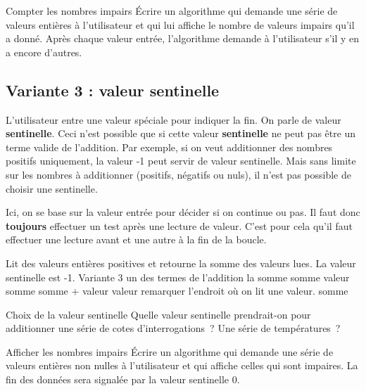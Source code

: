 		\begin{Exercice}{Compter les nombres impairs}
			Écrire un algorithme qui demande une série
			de valeurs entières à l'utilisateur
			et qui lui affiche le nombre de valeurs impairs
			qu'il a donné.
			Après chaque valeur entrée,
			l'algorithme demande à l'utilisateur s'il y en a encore d'autres.
		\end{Exercice}

	\subsection{Variante 3 : valeur sentinelle}
		
		L’utilisateur entre une valeur spéciale pour indiquer la fin. 
		On parle de valeur \textbf{sentinelle}. 
		Ceci n’est possible que si cette valeur \textbf{sentinelle} ne peut pas être
		un terme valide de l’addition. Par exemple, si on veut
		additionner des nombres positifs uniquement, la valeur -1 peut servir
		de valeur sentinelle. Mais sans limite sur les nombres à additionner
		(positifs, négatifs ou nuls), il n’est pas possible de
		choisir une sentinelle.

		Ici, on se base sur la valeur entrée pour décider si on continue ou pas. 
		Il faut donc \textbf{toujours} effectuer un test
		après une lecture de valeur. C’est pour cela
		qu’il faut effectuer une lecture avant et une autre à
		la fin de la boucle.

		\begin{LDA}
		\LComment Lit des valeurs entières positives et retourne la somme des valeurs lues.
		\LComment La valeur sentinelle est -1.
		 \RComment Variante 3
			 \RComment un des termes de l’addition
			 \RComment la somme
			\Let somme 
			\Read valeur
				\Let somme \Gets somme + valeur 
				\Read valeur \RComment remarquer l’endroit où on lit une valeur.
			\EndWhile
			\Return somme
		\EndAlgo
		\end{LDA}

		\begin{Exercice}{Choix de la valeur sentinelle}
			Quelle valeur sentinelle prendrait-on 
			pour additionner une série de cotes d’interrogations~? 
			Une série de températures~?
		\end{Exercice}

		\begin{Exercice}{Afficher les nombres impairs}
			Écrire un algorithme qui demande une série
			de valeurs entières non nulles à l'utilisateur
			et qui affiche celles qui sont impaires.
			La fin des données sera signalée 
			par la valeur sentinelle 0.
		\end{Exercice}

